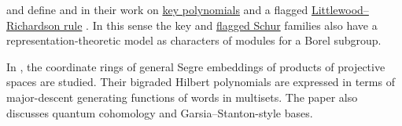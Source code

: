  and  define
\label{generalizedFlaggedSchurModule}
and \label{keyModule} in their
work on \hyperref[key]{key polynomials} and a flagged
\hyperref[schurLittlewoodRichardson]{Littlewood--Richardson rule}
\cite{ReinerShimozono1995}.  In this sense the key and
\hyperref[schurFlagged]{flagged Schur} families also have a
representation-theoretic model as characters of modules for a Borel subgroup.

In \cite{Szendroi2026x}, the coordinate rings of general Segre embeddings of
products of projective spaces are studied.  Their bigraded Hilbert polynomials
are expressed in terms of major-descent generating functions of words in
multisets.  The paper also discusses quantum cohomology and
Garsia--Stanton-style bases.

